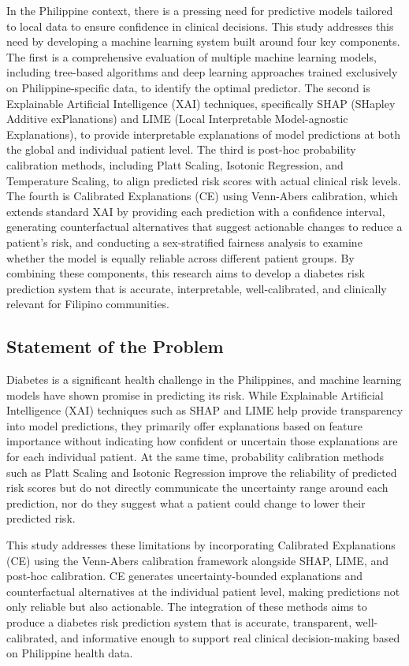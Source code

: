 In the Philippine context, there is a pressing need for predictive models tailored to local data to ensure confidence in clinical decisions. This study addresses this need by developing a machine learning system built around four key components. The first is a comprehensive evaluation of multiple machine learning models, including tree-based algorithms and deep learning approaches trained exclusively on Philippine-specific data, to identify the optimal predictor. The second is Explainable Artificial Intelligence (XAI) techniques, specifically SHAP (SHapley Additive exPlanations) and LIME (Local Interpretable Model-agnostic Explanations), to provide interpretable explanations of model predictions at both the global and individual patient level. The third is post-hoc probability calibration methods, including Platt Scaling, Isotonic Regression, and Temperature Scaling, to align predicted risk scores with actual clinical risk levels. The fourth is Calibrated Explanations (CE) using Venn-Abers calibration, which extends standard XAI by providing each prediction with a confidence interval, generating counterfactual alternatives that suggest actionable changes to reduce a patient's risk, and conducting a sex-stratified fairness analysis to examine whether the model is equally reliable across different patient groups. By combining these components, this research aims to develop a diabetes risk prediction system that is accurate, interpretable, well-calibrated, and clinically relevant for Filipino communities.


\subsection{Statement of the Problem}
Diabetes is a significant health challenge in the Philippines, and machine learning models have shown promise in predicting its risk. While Explainable Artificial Intelligence (XAI) techniques such as SHAP and LIME help provide transparency into model predictions, they primarily offer explanations based on feature importance without indicating how confident or uncertain those explanations are for each individual patient. At the same time, probability calibration methods such as Platt Scaling and Isotonic Regression improve the reliability of predicted risk scores but do not directly communicate the uncertainty range around each prediction, nor do they suggest what a patient could change to lower their predicted risk.

This study addresses these limitations by incorporating Calibrated Explanations (CE) using the Venn-Abers calibration framework alongside SHAP, LIME, and post-hoc calibration. CE generates uncertainty-bounded explanations and counterfactual alternatives at the individual patient level, making predictions not only reliable but also actionable. The integration of these methods aims to produce a diabetes risk prediction system that is accurate, transparent, well-calibrated, and informative enough to support real clinical decision-making based on Philippine health data.

